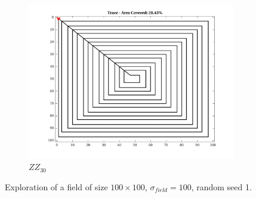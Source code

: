 \begin{figure}[htb!]
\begin{subfigure}[t]{0.25\textwidth}
    \end{subfigure}%
    \begin{subfigure}[t]{0.25\textwidth}
        \centering
        \includegraphics[width=\linewidth]{figures/path_zz_30p_100x100_sf_100_seed_1.png}
        \captionsetup{skip=0.20\baselineskip,size=footnotesize}
        \caption{$ZZ_{30}$}
    \end{subfigure}%
    \captionsetup{skip=0.20\baselineskip}
    \caption{Exploration of a field of size $100 \times 100$, $\sigma_{field} = 100$, random seed 1.}
    \label{fig:sf100}
\end{figure}

